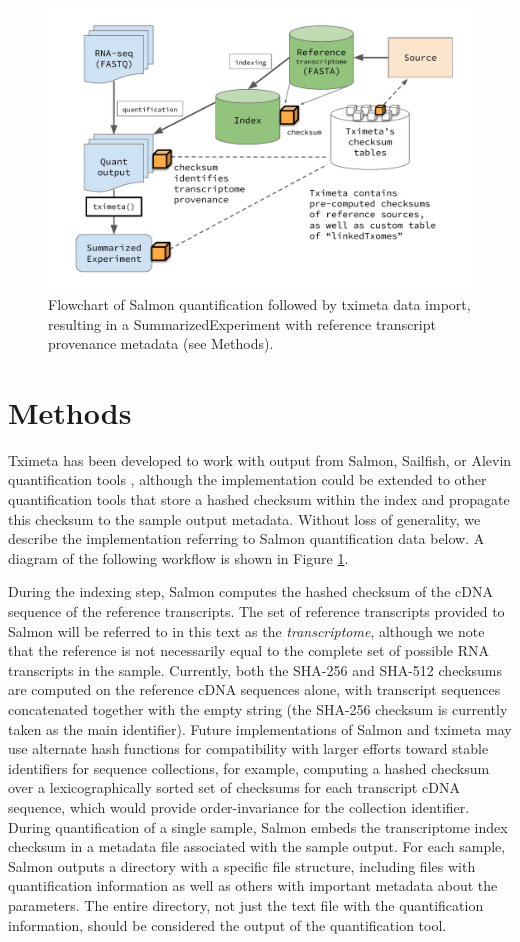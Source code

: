 \documentclass[12pt]{article} \usepackage[utf8]{inputenc}
\begin{document}
\begin{figure}
  \centering
  \includegraphics[width=.6\textwidth]{diagram.pdf}
  \caption{Flowchart of Salmon quantification followed by tximeta
    data import, resulting in a SummarizedExperiment with reference
    transcript provenance metadata (see Methods).}
  \label{fig:diagram}
\end{figure}

\section*{Methods}

Tximeta has been developed to work with output from Salmon, Sailfish,
or Alevin quantification tools \citep{sailfish,salmon,alevin},
although the implementation could be extended to other quantification
tools that store a hashed checksum within the index and propagate this
checksum to the sample output metadata. Without loss of generality, we
describe the implementation referring to Salmon quantification data
below. A diagram of the following workflow is shown in Figure
\ref{fig:diagram}. 

During the indexing step, Salmon computes the hashed checksum of the
cDNA sequence of the reference transcripts. The set of reference
transcripts provided to Salmon will be referred to in this text as the
\textit{transcriptome}, although we note that the reference is not
necessarily equal to the complete set of possible RNA transcripts in
the sample. Currently, both the SHA-256 and SHA-512 \citep{sha1}
checksums are computed on the reference cDNA sequences alone, with
transcript sequences concatenated together with the empty string (the
SHA-256 checksum is currently taken as the main identifier). Future
implementations of Salmon and tximeta may use alternate hash functions
for compatibility with larger efforts toward stable identifiers for
sequence collections, for example, computing a hashed checksum over a
lexicographically sorted set of checksums for each transcript cDNA
sequence, which would provide order-invariance for the collection
identifier. During quantification of a single sample, Salmon embeds
the transcriptome index checksum in a metadata file associated with
the sample output. For each sample, Salmon outputs a directory with a
specific file structure, including files with quantification
information as well as others with important metadata about the
parameters. The entire directory, not just the text file with the
quantification information, should be considered the output of
the quantification tool.
\end{document}
